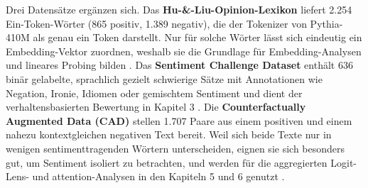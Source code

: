 Drei Datensätze ergänzen sich. Das \textbf{Hu-\&-Liu-Opinion-Lexikon} liefert 2.254 Ein-Token-Wörter (865 positiv, 1.389 negativ), die der Tokenizer von Pythia-410M als genau ein Token darstellt. Nur für solche Wörter lässt sich eindeutig ein Embedding-Vektor zuordnen, weshalb sie die Grundlage für Embedding-Analysen und lineares Probing bilden \cite{hu2004mining}. Das \textbf{Sentiment Challenge Dataset} enthält 636 binär gelabelte, sprachlich gezielt schwierige Sätze mit Annotationen wie Negation, Ironie, Idiomen oder gemischtem Sentiment und dient der verhaltensbasierten Bewertung in Kapitel 3 \cite{barnes2019sentiment}. Die \textbf{Counterfactually Augmented Data (CAD)} stellen 1.707 Paare aus einem positiven und einem nahezu kontextgleichen negativen Text bereit. Weil sich beide Texte nur in wenigen sentimenttragenden Wörtern unterscheiden, eignen sie sich besonders gut, um Sentiment isoliert zu betrachten, und werden für die aggregierten Logit-Lens- und \gls{attention}-Analysen in den Kapiteln 5 und 6 genutzt \cite{kaushik2020learning}.
